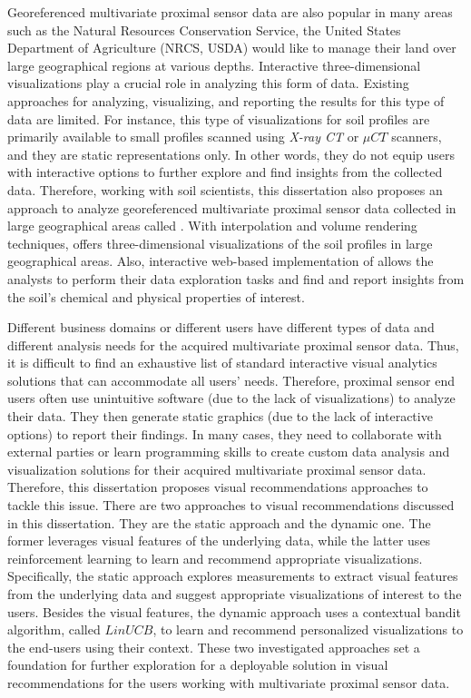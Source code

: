 Georeferenced multivariate proximal sensor data are also popular in many areas such as the Natural Resources Conservation Service, the United States Department of Agriculture (NRCS, USDA) would like to manage their land over large geographical regions at various depths. Interactive three-dimensional visualizations play a crucial role in analyzing this form of data. Existing approaches for analyzing, visualizing, and reporting the results for this type of data are limited. For instance, this type of visualizations for soil profiles are primarily available to small profiles scanned using \textit{X-ray CT} or $\mu CT$ scanners, and they are static representations only. In other words, they do not equip users with interactive options to further explore and find insights from the collected data. Therefore, working with soil scientists, this dissertation also proposes an approach to analyze georeferenced multivariate proximal sensor data collected in large geographical areas called \idvs{}. With interpolation and volume rendering techniques, \idvs{} offers three-dimensional visualizations of the soil profiles in large geographical areas. Also, interactive web-based implementation of \idvs{} allows the analysts to perform their data exploration tasks and find and report insights from the soil's chemical and physical properties of interest.

Different business domains or different users have different types of data and different analysis needs for the acquired multivariate proximal sensor data. Thus, it is difficult to find an exhaustive list of standard interactive visual analytics solutions that can accommodate all users' needs. Therefore, proximal sensor end users often use unintuitive software (due to the lack of visualizations) to analyze their data. They then generate static graphics (due to the lack of interactive options) to report their findings. In many cases, they need to collaborate with external parties or learn programming skills to create custom data analysis and visualization solutions for their acquired multivariate proximal sensor data. Therefore, this dissertation proposes visual recommendations approaches to tackle this issue. There are two approaches to visual recommendations discussed in this dissertation. They are the static approach and the dynamic one. The former leverages visual features of the underlying data, while the latter uses reinforcement learning to learn and recommend appropriate visualizations. Specifically, the static approach explores \scag{} measurements to extract visual features from the underlying data and suggest appropriate visualizations of interest to the users. Besides the visual features, the dynamic approach uses a contextual bandit algorithm, called $LinUCB$, to learn and recommend personalized visualizations to the end-users using their context. These two investigated approaches set a foundation for further exploration for a deployable solution in visual recommendations for the users working with multivariate proximal sensor data.

